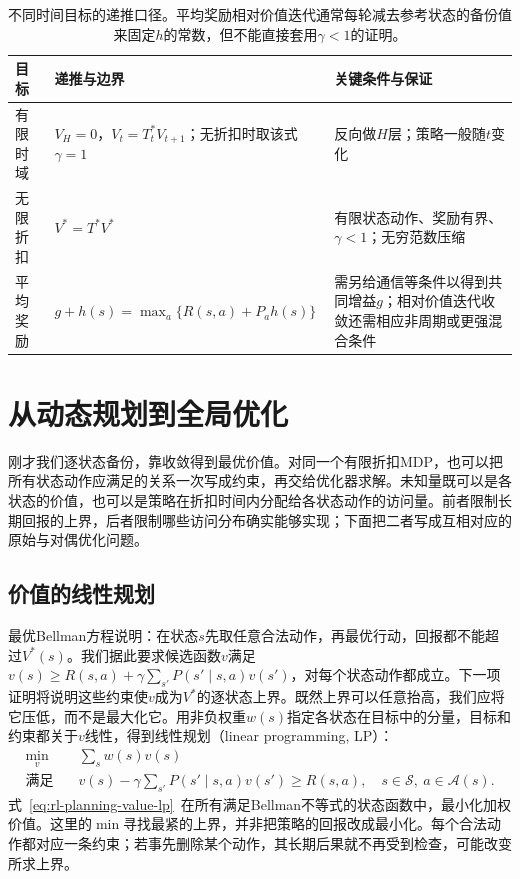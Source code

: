 \begin{table}[htbp]
 \centering
 \small
 \begin{tabularx}{\linewidth}{@{}l>{\raggedright\arraybackslash}X>{\raggedright\arraybackslash}X@{}}
  \toprule
  目标 & 递推与边界 & 关键条件与保证\\
  \midrule
  有限时域 & $V_H=0$，$V_t=T_t^*V_{t+1}$；无折扣时取该式$\gamma=1$ & 反向做$H$层；策略一般随$t$变化\\
  无限折扣 & $V^*=T^*V^*$ & 有限状态动作、奖励有界、$\gamma<1$；无穷范数压缩\\
  平均奖励 & $g+h(s)=\max_a\{R(s,a)+P_ah(s)\}$ & 需另给通信等条件以得到共同增益$g$；相对价值迭代收敛还需相应非周期或更强混合条件\\
  \bottomrule
 \end{tabularx}
 \caption{不同时间目标的递推口径。平均奖励相对价值迭代通常每轮减去参考状态的备份值来固定$h$的常数，但不能直接套用$\gamma<1$的证明。}
 \label{tab:rl-planning-horizons}
\end{table}

\section{从动态规划到全局优化}
\label{sec:rl-planning-linear-programming}

刚才我们逐状态备份，靠收敛得到最优价值。对同一个有限折扣MDP，也可以把所有状态动作应满足的关系一次写成约束，再交给优化器求解。未知量既可以是各状态的价值，也可以是策略在折扣时间内分配给各状态动作的访问量。前者限制长期回报的上界，后者限制哪些访问分布确实能够实现；下面把二者写成互相对应的原始与对偶优化问题。

\subsection{价值的线性规划}
\label{sec:rl-planning-value-lp}

最优Bellman方程说明：在状态$s$先取任意合法动作，再最优行动，回报都不能超过$V^*(s)$。我们据此要求候选函数$v$满足
$v(s)\geq R(s,a)+\gamma\sum_{s'}P(s'\mid s,a)v(s')$，对每个状态动作都成立。下一项证明将说明这些约束使$v$成为$V^*$的逐状态上界。既然上界可以任意抬高，我们应将它压低，而不是最大化它。用非负权重$w(s)$指定各状态在目标中的分量，目标和约束都关于$v$线性，得到线性规划（linear programming, LP）：
\begin{equation}
 \begin{aligned}
 \min_v\quad &\sum_s w(s)v(s)\\
 \text{满足}\quad
 &v(s)-\gamma\sum_{s'}P(s'\mid s,a)v(s')\geq R(s,a),
 \quad s\in\mathcal S,\ a\in\mathcal A(s).
 \end{aligned}
 \label{eq:rl-planning-value-lp}
\end{equation}
式~\eqref{eq:rl-planning-value-lp}~在所有满足Bellman不等式的状态函数中，最小化加权价值。这里的$\min$寻找最紧的上界，并非把策略的回报改成最小化。每个合法动作都对应一条约束；若事先删除某个动作，其长期后果就不再受到检查，可能改变所求上界。


